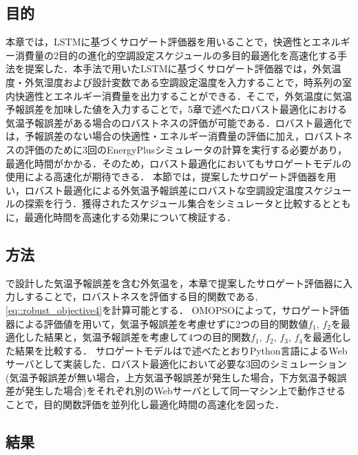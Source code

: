 \subsection{目的}
本章では，LSTMに基づくサロゲート評価器を用いることで，快適性とエネルギー消費量の2目的の進化的空調設定スケジュールの多目的最適化を高速化する手法を提案した．本手法で用いたLSTMに基づくサロゲート評価器では，外気温度・外気湿度および設計変数である空調設定温度を入力することで，時系列の室内快適性とエネルギー消費量を出力することができる．そこで，外気温度に気温予報誤差を加味した値を入力することで，5章で述べたロバスト最適化における気温予報誤差がある場合のロバストネスの評価が可能である．ロバスト最適化では，予報誤差のない場合の快適性・エネルギー消費量の評価に加え，ロバストネスの評価のために3回のEnergyPlusシミュレータの計算を実行する必要があり，最適化時間がかかる．そのため，ロバスト最適化においてもサロゲートモデルの使用による高速化が期待できる．
本節では，提案したサロゲート評価器を用い，ロバスト最適化による外気温予報誤差にロバストな空調設定温度スケジュールの探索を行う．獲得されたスケジュール集合をシミュレータと比較するとともに，最適化時間を高速化する効果について検証する．

\subsection{方法}
で設計した気温予報誤差を含む外気温を，本章で提案したサロゲート評価器に入力しすることで，ロバストネスを評価する目的関数である, \eqref{eq::robust_objective4}を計算可能とする．
OMOPSOによって，サロゲート評価器による評価値を用いて，気温予報誤差を考慮せずに2つの目的関数値$f_1$, $f_2$を最適化した結果と，気温予報誤差を考慮して4つの目的関数$f_1$, $f_2$, $f_3$, $f_4$を最適化した結果を比較する．
サロゲートモデルはで述べたとおりPython言語によるWebサーバとして実装した．ロバスト最適化において必要な3回のシミュレーション(気温予報誤差が無い場合，上方気温予報誤差が発生した場合，下方気温予報誤差が発生した場合)をそれぞれ別のWebサーバとして同一マシン上で動作させることで，目的関数評価を並列化し最適化時間の高速化を図った．

\subsection{結果}
